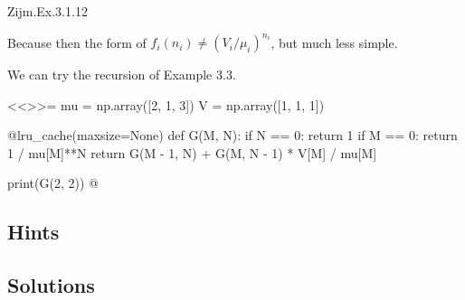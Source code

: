 \begin{question}
Zijm.Ex.3.1.12
\begin{solution}
  Because then the form of $f_i(n_i)\neq (V_i/\mu_i)^{n_i}$, but much
  less simple.

We can try the recursion of Example 3.3.

<<>>=
mu = np.array([2, 1, 3])
V = np.array([1, 1, 1])


@lru_cache(maxsize=None)
def G(M, N):
    if N == 0:
        return 1
    if M == 0:
        return 1 / mu[M]**N
    return G(M - 1, N) + G(M, N - 1) * V[M] / mu[M]

print(G(2, 2))
@

\end{solution}
\end{question}





\subsection*{Hints}

\subsection*{Solutions}

\clearpage
